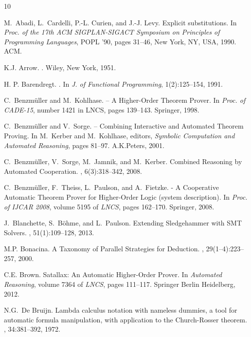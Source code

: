 \documentclass{llncs}
\begin{document}
\begin{thebibliography}{10}

M.~Abadi, L.~Cardelli, P.-L. Curien, and J.-J. Levy.
\newblock Explicit substitutions.
\newblock In {\em Proc. of the 17th ACM SIGPLAN-SIGACT Symposium on Principles
  of Programming Languages}, POPL '90, pages 31--46, New York, NY, USA, 1990.
  ACM.

K.J. Arrow.
.
\newblock Wiley, New York, 1951.

H. P. Barendregt.
.
\newblock In {\em J. of Functional Programming}, 1(2):125--154, 1991.

C.~Benzm\"uller and M.~Kohlhase.
 -- A Higher-Order Theorem Prover.
\newblock In {\em Proc. of CADE-15}, number 1421 in LNCS, pages 139--143.
  Springer, 1998.

C.~Benzm{\"u}ller and V.~Sorge.
 -- Combining Interactive and Automated Theorem Proving.
\newblock In M.~Kerber and M.~Kohlhase, editors, {\em Symbolic Computation and
  Automated Reasoning}, pages 81--97. A.K.Peters, 2001.

C.~Benzm{\"u}ller, V.~Sorge, M.~Jamnik, and M.~Kerber.
\newblock Combined Reasoning by Automated Cooperation.
, 6(3):318--342, 2008.

C.~Benzm{\"u}ller, F.~Theiss, L.~Paulson, and A.~Fietzke.
 - A Cooperative Automatic Theorem Prover for Higher-Order
  Logic (system description).
\newblock In {\em Proc. of IJCAR 2008}, volume 5195 of {\em LNCS}, pages
  162--170. Springer, 2008.

J.~Blanchette, S.~B\"ohme, and L.~Paulson.
\newblock Extending {Sledgehammer} with {SMT} Solvers.
, 51(1):109--128, 2013.

M.P. Bonacina.
\newblock A Taxonomy of Parallel Strategies for Deduction.
,
  29(1--4):223--257, 2000.

C.E. Brown.
\newblock Satallax: An Automatic Higher-Order Prover.
\newblock In {\em Automated Reasoning}, volume 7364 of {\em LNCS}, pages
  111--117. Springer Berlin Heidelberg, 2012.

N.G.~De Bruijn.
\newblock Lambda calculus notation with nameless dummies, a tool for automatic
  formula manipulation, with application to the {Church-Rosser} theorem.
, 34:381--392, 1972.


\end{thebibliography}
\end{document}
